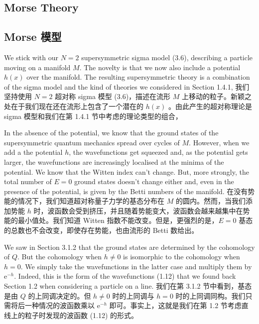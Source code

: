 \documentclass{article}
\newcommand{\rme}{\mathrm{e}}
\begin{document}
\begin{paracol}{2}
\subsection{Morse Theory}
\switchcolumn
\subsection*{Morse 模型}
\switchcolumn*

We stick with our $N = 2$ supersymmetric sigma model (3.6), describing a particle moving on a manifold $M$. The novelty is that we now also include a potential $h(x)$ over the manifold. The resulting supersymmetric theory is a combination of the sigma model and the kind of theories we considered in Section 1.4.1,
\switchcolumn
我们坚持使用 $N = 2$ 超对称 sigma 模型 (3.6)，描述在流形 $M$ 上移动的粒子。新颖之处在于我们现在还在流形上包含了一个潜在的 $h(x)$ 。由此产生的超对称理论是 sigma 模型和我们在第 1.4.1 节中考虑的理论类型的组合，
\switchcolumn*

In the absence of the potential, we know that the ground states of the supersymmetric quantum mechanics spread over cycles of $M$. However, when we add a the potential $h$, the wavefunctions get squeezed and, as the potential gets larger, the wavefunctions are increasingly localised at the minima of the potential. We know that the Witten index can’t change. But, more strongly, the total number of $E = 0$ ground states doesn’t change either and, even in the presence of the potential, is given by the Betti numbers of the manifold.
\switchcolumn
在没有势能的情况下，我们知道超对称量子力学的基态分布在 $M$ 的圆内。然而，当我们添加势能 $h$ 时，波函数会受到挤压，并且随着势能变大，波函数会越来越集中在势能的最小值处。我们知道 Witten 指数不能改变。但是，更强烈的是，$E = 0$ 基态的总数也不会改变，即使存在势能，也由流形的 Betti 数给出。
\switchcolumn*

We saw in Section 3.1.2 that the ground states are determined by the cohomology of $Q$. But the cohomology when $h \neq 0$ is isomorphic to the cohomology when $h = 0$. We simply take the wavefunctions in the latter case and multiply them by $\rme^{- h}$. Indeed, this is the form of the wavefunctions (1.12) that we found back Section 1.2 when considering a particle on a line.
\switchcolumn
我们在第 3.1.2 节中看到，基态是由 $Q$ 的上同调决定的。但 $h \neq 0$ 时的上同调与 $h = 0$ 时的上同调同构。我们只需将后一种情况的波函数乘以 $\rme^{- h}$ 即可。事实上，这就是我们在第 1.2 节考虑直线上的粒子时发现的波函数 (1.12) 的形式。
\switchcolumn*


\end{paracol}
\end{document}
